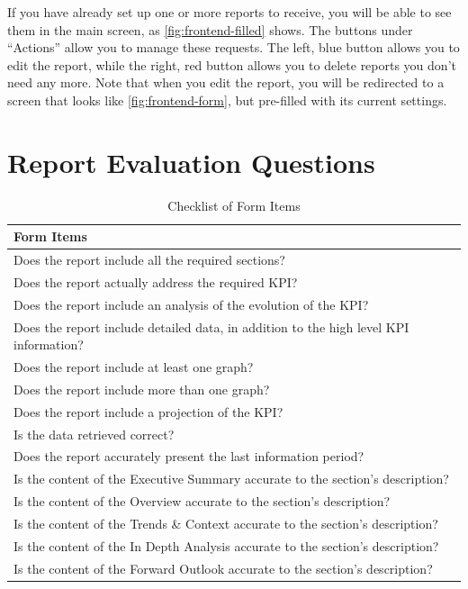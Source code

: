 \documentclass[a4paper]{report}
\begin{document}
If you have already set up one or more reports to receive, you will be able to see them in the main screen, as \autoref{fig:frontend-filled} shows. The buttons under ``Actions'' allow you to manage these requests. The left, blue button allows you to edit the report, while the right, red button allows you to delete reports you don't need any more. Note that when you edit the report, you will be redirected to a screen that looks like \autoref{fig:frontend-form}, but pre-filled with its current settings.

\chapter{Report Evaluation Questions}
\label{annex:evaluation}

\begin{table}[H]
\centering
\begin{tabular}{|p{14cm}|}
    \hline
    \textbf{Form Items} \\ \hline
    Does the report include all the required sections? \\ \hline
    Does the report actually address the required KPI? \\ \hline
    Does the report include an analysis of the evolution of the KPI? \\ \hline
    Does the report include detailed data, in addition to the high level KPI information? \\ \hline
    Does the report include at least one graph? \\ \hline
    Does the report include more than one graph? \\ \hline
    Does the report include a projection of the KPI? \\ \hline
    Is the data retrieved correct? \\ \hline
    Does the report accurately present the last information period? \\ \hline
    Is the content of the Executive Summary accurate to the section's description? \\ \hline
    Is the content of the Overview accurate to the section's description? \\ \hline
    Is the content of the Trends \& Context accurate to the section's description? \\ \hline
    Is the content of the In Depth Analysis accurate to the section's description? \\ \hline
    Is the content of the Forward Outlook accurate to the section's description? \\ \hline
\end{tabular}
\caption{Checklist of Form Items}
\end{table}
\end{document}
